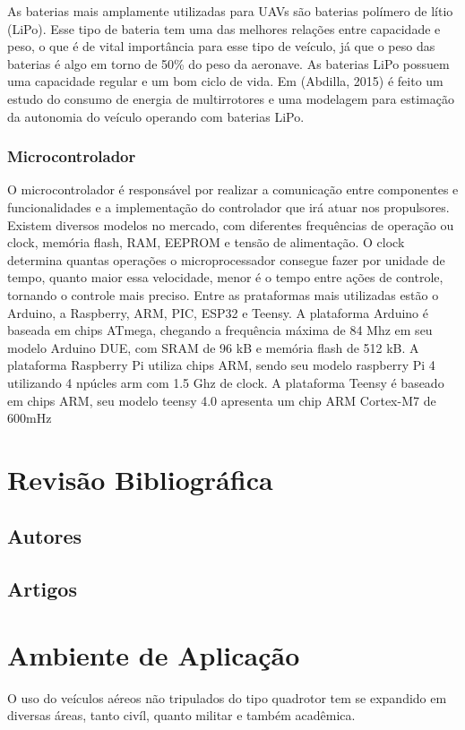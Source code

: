 As baterias mais amplamente utilizadas para UAVs são baterias polímero de lítio (LiPo). Esse tipo de bateria tem uma das melhores relações entre capacidade e peso, o que é de vital importância para esse tipo de veículo, já que o peso das baterias é algo em torno de 50\% do peso da aeronave. As baterias LiPo possuem uma capacidade regular e um bom ciclo de vida. Em (Abdilla, 2015) é feito um estudo do consumo de energia de multirrotores e uma modelagem para estimação da autonomia do veículo operando com baterias LiPo.  

\subsubsection{Microcontrolador}

O microcontrolador é responsável por realizar a comunicação entre componentes e funcionalidades e a implementação do controlador que irá atuar nos propulsores. Existem diversos modelos no mercado, com diferentes frequências de operação ou clock, memória flash, RAM, EEPROM e tensão de alimentação. O clock determina quantas operações o microprocessador consegue fazer por unidade de tempo, quanto maior essa velocidade, menor é o tempo entre ações de controle, tornando o controle mais preciso. Entre as prataformas mais utilizadas estão o Arduino, a Raspberry, ARM, PIC, ESP32 e Teensy. A plataforma Arduino é baseada em chips ATmega, chegando a frequência máxima de 84 Mhz em seu modelo Arduino DUE, com SRAM de 96 kB e memória flash de 512 kB. A plataforma Raspberry Pi utiliza chips ARM, sendo seu modelo raspberry Pi 4 utilizando 4 npúcles arm com 1.5 Ghz de clock. A plataforma Teensy é baseado em chips ARM, seu modelo teensy 4.0 apresenta um chip ARM Cortex-M7 de 600mHz

\section{Revisão Bibliográfica}
\subsection{Autores}
\subsection{Artigos}

\section{Ambiente de Aplicação}
O uso do veículos aéreos não tripulados do tipo quadrotor tem se expandido em diversas áreas, tanto civíl, quanto militar e também acadêmica.

